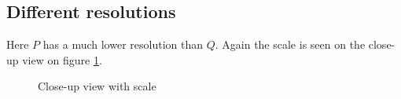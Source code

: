 \FloatBarrier


\subsection{Different resolutions}
Here $P$ has a much lower resolution than $Q$. Again the scale is seen on the close-up view on figure \ref{fig:t3_scale}.

\begin{figure}[h]
\center
{
\setlength{\fboxsep}{0pt}%
\setlength{\fboxrule}{0.5pt}%
}
\label{fig:t3_scale}
\caption{Close-up view with scale}
\end{figure}


